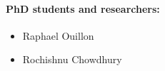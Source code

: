 \documentclass[10pt]{article}
\begin{document}
\paragraph{PhD students and researchers: }
\begin{itemize}
\item Raphael Ouillon
\item Rochishnu Chowdhury
\end{itemize}


% 
\begin{comment}

\begin{table}[h]

\normalsize
\begin{tabular}{l p{15cm}}

%
PI:         & Prof. Eckart Meiburg\\
Education:    & Dipl.-Ing., Mechanical Engineering, University of Karlsruhe, Germany      \\
              & Dr.-Ing., University of Karlsruhe, Germany \\ 
              & Professor, Department of Mechanical Engineering, UC Santa Barbara  \\ 
              & Experience with Supercomputing for more than 30 years      \\ [0.5cm]
              
              Member:         & Thomas K{\"o}llner\\
Education:    & MS., Mechanical Engineering, TU Ilmenau, Germany\\
              & Dr.-Ing, Mechanical Engineering, TU Ilmenau, Germany\\
		& PostDoc., Department of Mechanical Engineering, UC Santa Barbara\\
[0.5cm]
Member:         & Raphael Ouillon\\
Education:    & BS, Mechanical Engineering, EPFL, Switzerland\\
              & MA, Mechanical Engineering, EPFL, Switzerland\\
              & PhD student, Mechanical Engineering, UC Santa Barbara\\                       [0.5cm]
              

\end{comment}
\end{document}

